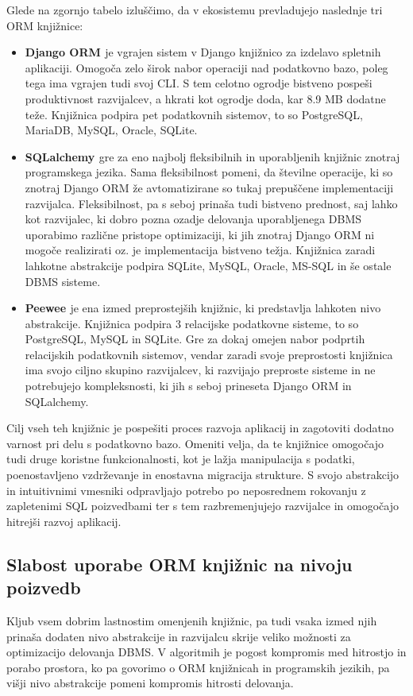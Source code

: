 \documentclass[a4paper,12pt,openright]{book}
\begin{document}
    \noindent
    Glede na zgornjo tabelo izluščimo, da v ekosistemu prevladujejo naslednje tri ORM knjižnice:
    \begin{itemize}
        \item \textbf{Django ORM \cite{DJANGO_GITHUB}} je vgrajen sistem v Django knjižnico za izdelavo spletnih aplikaciji. Omogoča zelo širok nabor operaciji nad podatkovno bazo, poleg tega ima vgrajen tudi svoj CLI. S tem celotno ogrodje bistveno pospeši produktivnost razvijalcev, a hkrati kot ogrodje doda, kar 8.9 MB dodatne teže. Knjižnica podpira pet podatkovnih sistemov, to so PostgreSQL, MariaDB, MySQL, Oracle, SQLite.
        \item \textbf{SQLalchemy \cite{SQLALCHEMY_GITHUB}} gre za eno najbolj fleksibilnih in uporabljenih knjižnic znotraj programskega jezika. Sama fleksibilnost pomeni, da številne operacije, ki so znotraj Django ORM že avtomatizirane so tukaj prepuščene implementaciji razvijalca. Fleksibilnost, pa s seboj prinaša tudi bistveno prednost, saj lahko kot razvijalec, ki dobro pozna ozadje delovanja uporabljenega DBMS uporabimo različne pristope optimizaciji, ki jih znotraj Django ORM ni mogoče realizirati oz. je implementacija bistveno težja. Knjižnica zaradi lahkotne abstrakcije podpira SQLite, MySQL, Oracle, MS-SQL in še ostale DBMS sisteme.
        \item \textbf{Peewee \cite{PEEWEE_GITHUB}} je ena izmed preprostejših knjižnic, ki predstavlja lahkoten nivo abstrakcije. Knjižnica podpira 3 relacijske podatkovne sisteme, to so PostgreSQL, MySQL in SQLite. Gre za dokaj omejen nabor podprtih relacijskih podatkovnih sistemov, vendar zaradi svoje preprostosti knjižnica ima svojo ciljno skupino razvijalcev, ki razvijajo preproste sisteme in ne potrebujejo kompleksnosti, ki jih s seboj prineseta Django ORM in SQLalchemy.
    \end{itemize}

    \noindent
    Cilj vseh teh knjižnic je pospešiti proces razvoja aplikacij in zagotoviti dodatno varnost pri delu s podatkovno bazo. Omeniti velja, da te knjižnice omogočajo tudi druge koristne funkcionalnosti, kot je lažja manipulacija s podatki, poenostavljeno vzdrževanje in enostavna migracija strukture. S svojo abstrakcijo in intuitivnimi vmesniki odpravljajo potrebo po neposrednem rokovanju z zapletenimi SQL poizvedbami ter s tem razbremenjujejo razvijalce in omogočajo hitrejši razvoj aplikacij.

    \subsection{Slabost uporabe ORM knjižnic na nivoju poizvedb}
    Kljub vsem dobrim lastnostim omenjenih knjižnic, pa tudi vsaka izmed njih prinaša dodaten nivo abstrakcije in razvijalcu skrije veliko možnosti za optimizacijo delovanja DBMS. V algoritmih je pogost kompromis med hitrostjo in porabo prostora, ko pa govorimo o ORM knjižnicah in programskih jezikih, pa višji nivo abstrakcije pomeni kompromis hitrosti delovanja.
\end{document}
